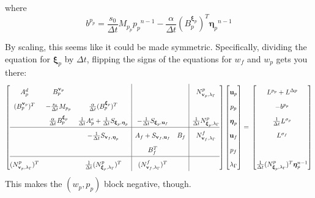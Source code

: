 \documentclass{article}
\newcommand{\mathspace}[1]{\ensuremath{#1}\xspace} %
\newcommand{\dt}{\mathspace{\Delta t}}
\newcommand{\matzero}{}        %
\newcommand{\uf}{\mathspace{\mathbf{u}_f}}
\newcommand{\vf}{\mathspace{\mathbf{v}_f}}
\newcommand{\up}{\mathspace{\mathbf{u}_p}}
\newcommand{\vp}{\mathspace{\mathbf{v}_p}}
\newcommand{\pf}{\mathspace{p_f}}
\newcommand{\pp}{\mathspace{p_p}}
\newcommand{\wf}{\mathspace{w_f}}
\renewcommand{\wp}{\mathspace{w_p}}
\newcommand{\disp}{\mathspace{\boldsymbol{\eta}_p}}
\newcommand{\disptest}{\mathspace{\boldsymbol{\xi}_p}}
\newcommand{\mult}{\mathspace{\lambda_{\Gamma}}}
\newcommand{\multtest}{\mathspace{\mu_{\Gamma}}}
\begin{document}
where
$$b^{\pp} = \frac {s_0}{\dt} M_{\pp} \pp^{n-1} - \frac {\alpha} {\dt} (B_p^{\disptest})^T \disp^{n-1}$$

By scaling, this seems like it could be made symmetric. Specifically, dividing the equation for \disptest by \dt, flipping the signs of the equations for \wf and \wp gets you there:
\[ \renewcommand{\arraystretch}{1.8}
  \left[\begin{array}{@{}ccc|cc|c@{}}
          
          A^d_p & B^{\vp}_p & \matzero & \matzero & \matzero & N^p_{\vp, \mult} \\ %
          (B^{\vp}_p)^T & -\frac {s_0}{\dt} M_{\pp} & \frac{\alpha}{\dt} (B^{\disptest}_p)^T & \matzero & \matzero & \matzero\\ %
          \matzero & \frac {\alpha} {\dt} B^{\disptest}_p & \frac 1 {\dt}A^e_p + \frac 1 {\dt} S_{\disptest, \disp} & -\frac 1 {\dt} S_{\disptest, \uf} & \matzero &\frac 1 {\dt} N^p_{\disptest, \mult}\\ %
          \hline
          \matzero & \matzero & - \frac 1 {\dt} S_{\vf, \disp} & A_f + S_{\vf, \uf} & B_f & N^f_{\vf, \mult}\\ %
          \matzero & \matzero & \matzero & B_f^T & \matzero & \matzero \\ %
          \hline
          (N^p_{\vp, \mult})^T & \matzero & \frac 1 {\dt} (N^p_{\disptest, \mult})^T & (N^f_{\vf, \mult})^T & \matzero & \matzero \\ %

        \end{array}\right]
      \left[\begin{array}{@{}c@{}}
                \up \\
                \pp \\
                \disp \\
                \uf \\
                \pf \\
                \mult
            \end{array}\right]
          = \newline
                      \left[\begin{array}{@{}c@{}}
                L^{\pp} + L^{\Delta p} \\
                              -b^{\pp} \\
                              \frac 1 {\dt}L^{\sigma_p} \\
                L^{\sigma_f} \\
                \matzero \\
                \frac 1 {\dt} (N^p_{\disptest, \mult})^T \disp^{n-1} \\
        \end{array}\right]
\]
This makes the $(\wp, \pp)$ block negative, though.
\end{document}
